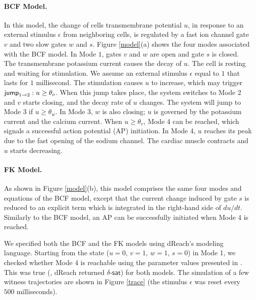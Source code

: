 \paragraph{BCF Model.}
In this model, the change of cells transmembrane potential $u$, in response to an external stimulus $\epsilon$ from neighboring cells, is regulated by a fast ion channel gate $v$ and two slow gates $w$ and $s$.
Figure \ref{model}(a) shows the four modes associated with the BCF model. In Mode $1$, gates $v$ and $w$ are open and gate $s$ is closed. The transmembrane potassium current causes the decay of $u$. The cell is resting and waiting for stimulation. We assume an external stimulus $\epsilon$ equal to $1$ that lasts for $1$ millisecond. The stimulation causes $u$ to increase, which may trigger $\mathsf{jump}_{1 \rightarrow 2}: u \geq \theta_o$. When this jump takes place, the system switches to Mode 2 and $v$ starts closing, and the decay rate of $u$ changes. The system will jump to Mode 3 if $u \geq \theta_w$. In Mode 3, $w$ is also closing; $u$ is governed by the potassium current and the calcium current. When $u \geq \theta_v$, Mode 4 can be reached, which signals a successful action potential (AP) initiation. In Mode 4, $u$ reaches its peak due to the fast opening of the sodium channel. The cardiac muscle contracts and $u$ starts decreasing.

\paragraph{FK Model.}
As shown in Figure \ref{model}(b), this model comprises the same four modes and equations of the BCF model, except that the current change induced by gate $s$ is reduced to an explicit term which is integrated in the right-hand side of $du/dt$. Similarly to the BCF model, an AP can be successfully initiated when Mode 4 is reached.

\vspace{1ex}
We specified both the BCF and the FK models using dReach's modeling language. Starting from the state ($u = 0$, $v = 1$, $w = 1$, $s = 0$) in Mode 1, we checked whether Mode 4 is reachable using the parameter values presented in \cite{orovio08}. This was true (\ie, dReach returned $\delta$-$\mathsf{sat}$) for both models.
The simulation of a few witness trajectories are shown in Figure \ref{trace} (the stimulus $\epsilon$ was reset every $500$ milliseconds).


